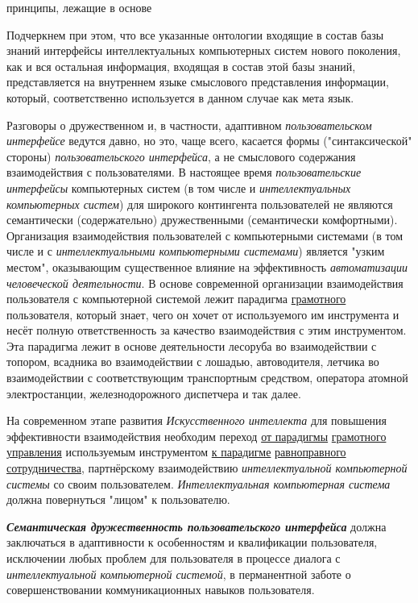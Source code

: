\begin{SCn}
\begin{scnrelfromlistcustom}{принципы, лежащие в основе}
{\begin{itemize}[labelsep=\tabsize-\bulletsize,leftmargin=\tabsize,label=$\bullet$]
				Подчеркнем при этом, что все указанные онтологии входящие в состав базы знаний интерфейсы интеллектуальных компьютерных систем нового поколения, как и вся остальная информация, входящая в состав этой базы знаний, представляется на внутреннем языке смыслового представления информации, который, соответственно используется в данном случае как мета язык.
			\end{itemize}
		}
	\end{scnrelfromlistcustom}
\end{SCn}

Разговоры о дружественном и, в частности, адаптивном \textit{пользовательском интерфейсе} ведутся давно, но это, чаще всего, касается формы ("синтаксической" стороны) \textit{пользовательского интерфейса}, а не смыслового содержания взаимодействия с пользователями. В настоящее время \textit{пользовательские интерфейсы} компьютерных систем (в том числе и \textit{интеллектуальных компьютерных систем}) для широкого контингента пользователей не являются семантически (содержательно) дружественными (семантически комфортными). Организация взаимодействия пользователей с компьютерными системами (в том числе и с \textit{интеллектуальными компьютерными системами}) является "узким местом"{}, оказывающим существенное влияние на эффективность \textit{автоматизации человеческой деятельности}. В основе современной организации взаимодействия пользователя с компьютерной системой лежит парадигма \underline{грамотного} пользователя, который знает, чего он хочет от используемого им инструмента и несёт полную ответственность за качество взаимодействия с этим инструментом. Эта парадигма лежит в основе деятельности лесоруба во взаимодействии с топором, всадника во взаимодействии с лошадью, автоводителя, летчика во взаимодействии с соответствующим транспортным средством, оператора атомной электростанции, железнодорожного диспетчера и так далее.

На современном этапе развития \textit{Искусственного интеллекта} для повышения эффективности взаимодействия необходим переход \underline{от парадигмы} \underline{грамотного} \underline{управления} используемым инструментом \underline{к парадигме} \underline{равноправного} \underline{сотрудничества}, партнёрскому взаимодействию \textit{интеллектуальной компьютерной системы} со своим пользователем. \textit{Интеллектуальная компьютерная система} должна повернуться "лицом" к пользователю.

\textbf{\textit{Семантическая дружественность пользовательского интерфейса}} должна заключаться в адаптивности к особенностям и квалификации пользователя, исключении любых проблем для пользователя в процессе диалога с \textit{интеллектуальной компьютерной системой}, в перманентной заботе о совершенствовании коммуникационных навыков пользователя.

